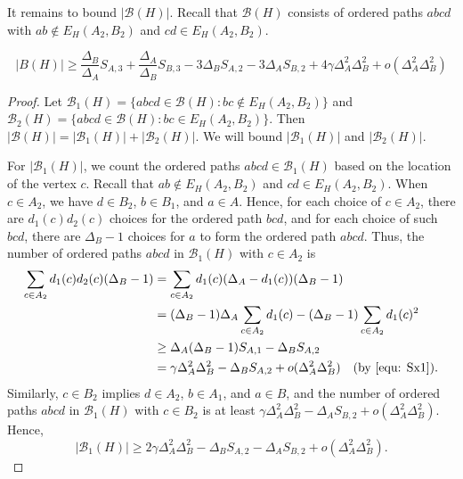 \documentclass[11pt]{amsart}
\newcommand{\bb}{\mathcal{B}}
\begin{document}
It remains to bound $|\bb(H)|$. Recall that $\bb(H)$ consists of ordered paths $abcd$ with $ab\notin E_H(A_2,B_2)$ and $cd\in E_H(A_2,B_2)$.
\begin{lemma}\label{clm BH} 
\[
  |B(H)| \ge    \frac{\Delta_B}{\Delta_A}S_{A,3}+\frac{\Delta_A}{\Delta_B} S_{B,3}- 3\Delta_B S_{A,2} -3\Delta_A S_{B,2} + 4\gamma \Delta_A^2\Delta_B^2
          +o(\Delta_A^2\Delta_B^2)   \]
\end{lemma}
\begin{proof} 
 Let $\bb_1(H)=\big\{abcd\in \bb(H): bc\notin E_H(A_2,B_2)\big\}$ and $\bb_2(H)=\big\{abcd\in \bb(H): bc\in E_H(A_2,B_2)\big\}$.  Then $|\bb(H)|=|\bb_1(H)|+|\bb_2(H)|$. We will bound $|\bb_1(H)|$ and $|\bb_2(H)|$. 

For $|\bb_1(H)|$, we count the ordered paths $abcd \in \mathcal{B}_1(H)$ based on the location of the vertex $c$. Recall that $ab\notin E_H(A_2,B_2)$ and $cd \in E_H(A_2, B_2)$. When $c \in A_2$, we have $d\in B_2$, $b\in B_1$, and $a\in A$. Hence, for each choice of $c\in A_2$, there are $d_1(c)d_2(c)$ choices for the ordered path $bcd$, and for each choice of such $bcd$, there are $\Delta_B -1$ choices for $a$ to form the ordered path $abcd$. Thus, the number of ordered paths $abcd$ in $\bb_1(H)$ with $c\in A_2$ is 
\begin{align*}
    \sum_{c\in A_2}d_1(c)d_2(c)(\Delta_B -1)
    &= \sum_{c\in A_2}d_1(c)(\Delta_A-d_1(c))(\Delta_B -1)\\
    &= (\Delta_B-1)\Delta_A  \sum_{c\in A_2}d_1(c)-(\Delta_B-1) \sum_{c\in A_2}d_1(c)^2\\
    &\ge  \Delta_A (\Delta_B-1) S_{A,1}- \Delta_B S_{A,2} \\
    &=%
    \gamma\Delta_A^2 \Delta_B^2  - \Delta_B S_{A,2} +o(\Delta_A^2 \Delta_B^2) \quad (\mbox{by } \eqref{equ: Sx1}).
\end{align*} 
Similarly, $c \in B_2$ implies $d\in A_2$, $b\in A_1$, and $a\in B$, and  the number of ordered paths $abcd$ in $\bb_1(H)$ with $c\in B_2$ is at least
 $\gamma\Delta_A^2 \Delta_B^2- \Delta_A S_{B,2}+o(\Delta_A^2 \Delta_B^2)$. Hence, 
\[
    |\bb_1(H)|\ge 2\gamma\Delta_A^2 \Delta_B^2- \Delta_B S_{A,2}- \Delta_A S_{B,2}+o(\Delta_A^2 \Delta_B^2).
\] 
 

\end{proof}
\end{document}
